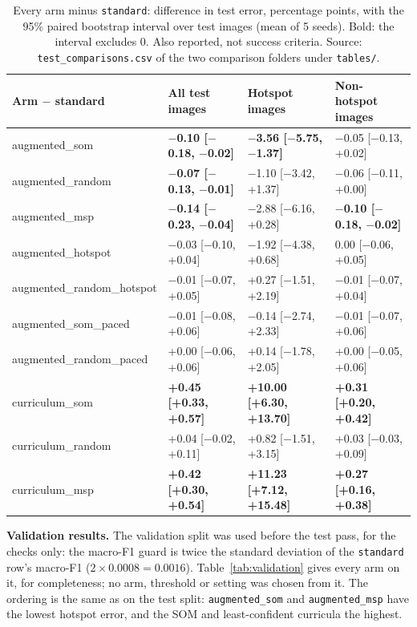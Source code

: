 \documentclass[11pt]{article}
\begin{document}
\begin{table}[H]
\centering
\renewcommand{\arraystretch}{1.1}
\footnotesize
{\setlength{\tabcolsep}{4pt}\begin{tabular}{|l|C{0.22\textwidth}|C{0.22\textwidth}|C{0.22\textwidth}|}
\hline
\textbf{Arm $-$ standard} & \textbf{All test images} & \textbf{Hotspot images} & \textbf{Non-hotspot images} \\ \hline
augmented\_som & \textbf{$-$0.10 [$-$0.18, $-$0.02]} & \textbf{$-$3.56 [$-$5.75, $-$1.37]} & $-$0.05 [$-$0.13, +0.02] \\ \hline
augmented\_random & \textbf{$-$0.07 [$-$0.13, $-$0.01]} & $-$1.10 [$-$3.42, +1.37] & $-$0.06 [$-$0.11, +0.00] \\ \hline
augmented\_msp & \textbf{$-$0.14 [$-$0.23, $-$0.04]} & $-$2.88 [$-$6.16, +0.28] & \textbf{$-$0.10 [$-$0.18, $-$0.02]} \\ \hline
augmented\_hotspot & $-$0.03 [$-$0.10, +0.04] & $-$1.92 [$-$4.38, +0.68] & 0.00 [$-$0.06, +0.05] \\ \hline
augmented\_random\_hotspot & $-$0.01 [$-$0.07, +0.05] & +0.27 [$-$1.51, +2.19] & $-$0.01 [$-$0.07, +0.04] \\ \hline
augmented\_som\_paced & $-$0.01 [$-$0.08, +0.06] & $-$0.14 [$-$2.74, +2.33] & $-$0.01 [$-$0.07, +0.06] \\ \hline
augmented\_random\_paced & +0.00 [$-$0.06, +0.06] & +0.14 [$-$1.78, +2.05] & +0.00 [$-$0.05, +0.06] \\ \hline
curriculum\_som & \textbf{+0.45 [+0.33, +0.57]} & \textbf{+10.00 [+6.30, +13.70]} & \textbf{+0.31 [+0.20, +0.42]} \\ \hline
curriculum\_random & +0.04 [$-$0.02, +0.11] & +0.82 [$-$1.51, +3.15] & +0.03 [$-$0.03, +0.09] \\ \hline
curriculum\_msp & \textbf{+0.42 [+0.30, +0.54]} & \textbf{+11.23 [+7.12, +15.48]} & \textbf{+0.27 [+0.16, +0.38]} \\ \hline
\end{tabular}}
\caption{Every arm minus \texttt{standard}: difference in test error, percentage points, with the 95\% paired bootstrap interval over test images (mean of 5 seeds). Bold: the interval excludes 0. Also reported, not success criteria. Source: \texttt{test\_comparisons.csv} of the two comparison folders under \texttt{tables/}.}
\label{tab:vs_standard}
\end{table}

\textbf{Validation results.} The validation split was used before the test pass, for the checks only: the macro-F1 guard is twice the standard deviation of the \texttt{standard} row's macro-F1 ($2\times0.0008=0.0016$). Table~\ref{tab:validation} gives every arm on it, for completeness; no arm, threshold or setting was chosen from it. The ordering is the same as on the test split: \texttt{augmented\_som} and \texttt{augmented\_msp} have the lowest hotspot error, and the SOM and least-confident curricula the highest.
\end{document}
